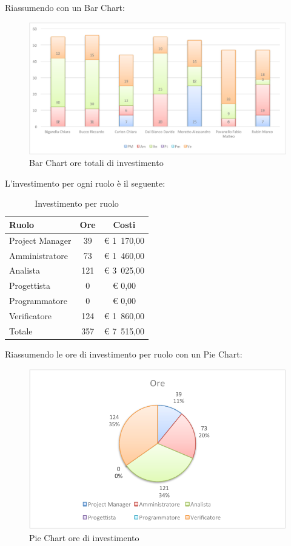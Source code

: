 				Riassumendo con un Bar Chart:
				\begin{figure}[H]\centering
					\includegraphics[width=\textwidth]{PianoDiProgetto/Pics/ChartOreInvest.pdf}
					\caption{Bar Chart ore totali di investimento}
				\end{figure}
				L'investimento per ogni ruolo è il seguente:
				\begin{table}[H]
					\begin{center}
						\begin{tabular}{| l | c | c |}
							\hline
							Ruolo 			& Ore 		& Costi  \\ \hline
							
							Project Manager	& 39 		& \euro{} 1~170,00 	\\
							Amministratore 		& 73 		& \euro{} 1~460,00 	\\
							Analista	 		& 121 	& \euro{} 3~025,00 	\\
							Progettista 		& 0		& \euro{} 0,00 	\\
							Programmatore		& 0		& \euro{} 0,00	\\
							Verificatore		& 124 	& \euro{} 1~860,00 	\\ \hline \hline
							
							Totale	 		& 357 	& \euro{} 7~515,00 	\\ \hline
						\end{tabular}
					\end{center}
					\caption{Investimento per ruolo}
				\end{table}
				Riassumendo le ore di investimento per ruolo con un Pie Chart:
				\begin{figure}[H]\centering
					\includegraphics[width=\textwidth]{PianoDiProgetto/Pics/ChartTotOreInvest.pdf}
					\caption{Pie Chart ore di investimento}
				\end{figure}
